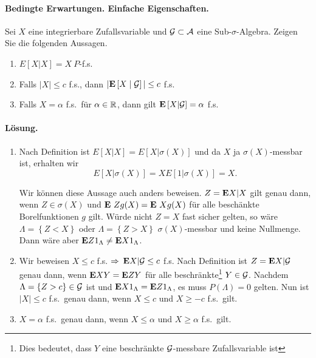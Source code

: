 \paragraph{Bedingte Erwartungen. Einfache Eigenschaften.} Sei $X$ eine
integrierbare Zufallsvariable und $\mathcal G \subset \mathcal A$ eine Sub-$\sigma$-Algebra.
Zeigen Sie die folgenden Aussagen.
\begin{enumerate}
    \item $E\left[ X|X \right] = X \ P$-f.s.
    \item Falls $| X| \leq c$ f.s., dann $| \mathbf{E} \left[ X \;\middle\vert\; \mathcal G \right] | \leq c$ f.s.
    \item Falls $X=\alpha$ f.s.\ für $\alpha\in\mathbb R$, dann gilt 
        $\mathbf{E} \left[ X | \mathcal G  \right]= \alpha $ f.s.
\end{enumerate}


\paragraph*{Lösung.} 
\begin{enumerate}
    \item 
        Nach Definition ist $E\left[ X| X \right]=E\left[ X|\sigma\left( X
        \right) \right]$ und da $X$ ja $\sigma\left( X \right)$-messbar ist,
        erhalten wir \begin{equation*} E\left[ X|\sigma\left( X \right)
            \right]= X E\left[ 1 | \sigma\left( X \right) \right] =X.
        \end{equation*}

        Wir können diese Aussage auch anders beweisen. $Z= \mathbf{E} X | X$ gilt genau
        dann, wenn $Z \in \sigma(X)$ und $\mathbf{E}\ Z g(X) = \mathbf{E}\ X g(X)$ für alle
        beschänkte Borelfunktionen $g$ gilt.  Würde nicht $Z = X$ fast sicher
        gelten, so wäre $\Lambda=\left\{ Z< X \right\}$ oder $\Lambda= \left\{
        Z > X \right\}$ $\sigma(X)$-messbar und keine Nullmenge. Dann wäre aber
        $\mathbf{E} Z 1_{\Lambda} \neq \mathbf{E} X 1_{\Lambda}$.
    \item Wir beweisen $X \leq c$ f.s. $\Rightarrow$ $ \mathbf{E} X | \mathcal G \leq c$ f.s. Nach
        Definition ist $Z=\mathbf{E} X|\mathcal G$ genau dann, wenn $\mathbf{E} X Y = \mathbf{E} Z Y$ für alle
        beschränkte\footnote{Dies bedeutet, dass $Y$ eine beschränkte
        $\mathcal G$-messbare Zufallsvariable ist} $Y\in \mathcal G$. Nachdem $\Lambda =
        \left\{ Z>c \right\} \in \mathcal G$ ist und $\mathbf{E} X 1_\Lambda = \mathbf{E} Z
        1_\Lambda$, es muss $P\left( \Lambda \right)=0$ gelten.  Nun ist $| X |
        \leq c$ f.s.\ genau dann, wenn $X \leq c$ und $ X \geq -c$ f.s.\ gilt.
    \item $X=\alpha$ f.s.\ genau dann, wenn $X \leq \alpha$ und $ X \geq
        \alpha$ f.s.\ gilt.
\end{enumerate}




